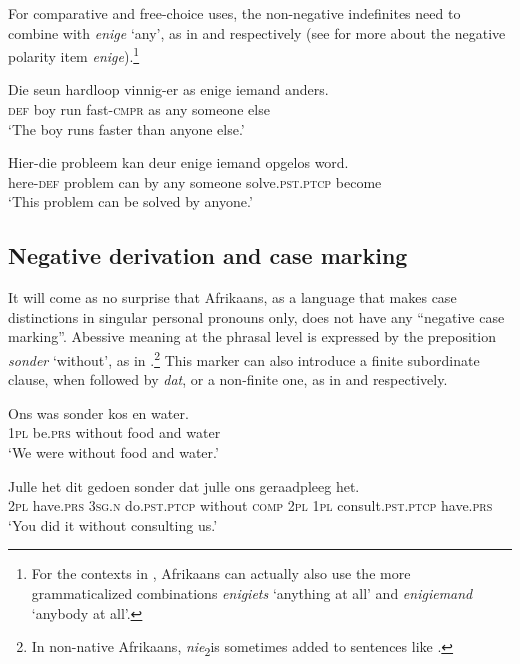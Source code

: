 \documentclass[output=paper,colorlinks,citecolor=brown]{langscibook}
\begin{document}
    \z
\z 

For  comparative and free-choice uses, the non-negative indefinites need to combine with \textit{enige} ‘any’, as in  and  respectively (see  for more about the negative polarity item \textit{enige}).\footnote{For the contexts in , Afrikaans can actually also use the more grammaticalized combinations \textit{enigiets} ‘anything at all’ and \textit{enigiemand} ‘anybody at all’.}

\ea\label{ex:afr:32}
    \ea\label{ex:afr:32a}
        \gll Die seun hardloop vinnig-er as enige iemand anders. \\ 
             \textsc{def} boy run fast-\textsc{cmpr} as any someone  else \\
        \glt ‘The boy runs faster than anyone else.’
    
    \ex\label{ex:afr:32b}
        \gll Hier-die probleem kan deur enige iemand opgelos word. \\
             here-\textsc{def} problem can by any someone solve.\textsc{pst.ptcp} become \\
        \glt ‘This problem can be solved by anyone.’
    \z
\z 


\subsection{Negative derivation and case marking}
\label{sec:afr:3.3}
It will come as no surprise that Afrikaans, as a language that makes case distinctions in singular personal pronouns only, does not have any “negative case marking”. Abessive meaning at the phrasal level is expressed by the preposition \textit{sonder} ‘without’, as in .\footnote{In non-native Afrikaans, \textit{nie}\textsubscript{2}is sometimes added to sentences like .} This marker can also introduce a finite subordinate clause, when followed by \textit{dat}, or a non-finite one, as in  and  respectively.

\ea\label{ex:afr:33}
    \ea\label{ex:afr:33a}
        \gll Ons was sonder kos en water. \\ 
             1\textsc{pl} be.\textsc{prs} without food and water \\
        \glt ‘We were without food and water.’
    
    \ex\label{ex:afr:33b}
        \gll Julle het dit gedoen sonder dat julle ons geraadpleeg het. \\
             2\textsc{pl} have.\textsc{prs} \textsc{3sg.n} do.\textsc{pst.ptcp} without \textsc{comp} \textsc{2pl} \textsc{1pl} consult.\textsc{pst.ptcp} have.\textsc{prs} \\
        \glt ‘You did it without consulting us.’
        
\end{document}
